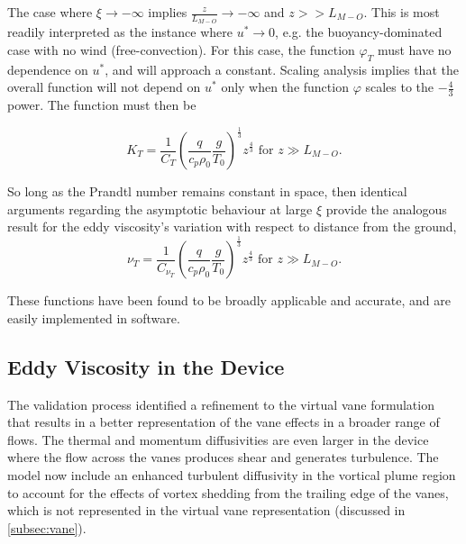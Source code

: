 The case where $\xi \to -\infty $ implies $\frac{z}{L_{M-O}} \to
-\infty $ and $z>>L_{M-O}$. This is most readily interpreted as the instance
where $u^* \to 0$, e.g. the buoyancy-dominated case with no wind
(free-convection). For this case, the function $\varphi_T$ must have no
dependence on $u^*$, and will approach a constant. Scaling
analysis implies that the overall function will not depend on $u^*$ only
when the function $\varphi$ scales to the $-\frac{4}{3}$ power. The
function must then be

\begin{equation}
 K_T = \frac{1}{C_T} \left( \frac{q}{c_p \rho_0} \frac{g}{T_0}
		     \right)^\frac{1}{3} z^{\frac{4}{3}}  \text{ 
for } z \gg L_{M-O}. 
\end{equation}

So long as the Prandtl number remains constant in space, then
identical arguments regarding the asymptotic behaviour at large $\xi$ provide
the analogous result for the eddy viscosity's variation with respect to
distance from the ground,  
\begin{equation}
 \nu_T = \frac{1}{C_{\nu_T}} \left( \frac{q}{c_p \rho_0} \frac{g}{T_0}
			     \right)^\frac{1}{3} z^{\frac{4}{3}}  \text{ 
for } z \gg L_{M-O}. 
\end{equation}

These functions have been found to be broadly applicable and
accurate\cite{Foken2006}, and are easily implemented in software.

\subsection{Eddy Viscosity in the Device}

The validation process identified a refinement to the virtual vane
formulation that results in a better representation of the vane
effects in a broader range of flows. The thermal and momentum
diffusivities are even larger in the device where the flow across the
vanes produces shear and generates turbulence. The model now include an
enhanced turbulent diffusivity in the vortical plume region to account
for the effects of vortex shedding from the trailing edge of the vanes,
which is not represented in the virtual vane representation (discussed in
\ref{subsec:vane}). 


